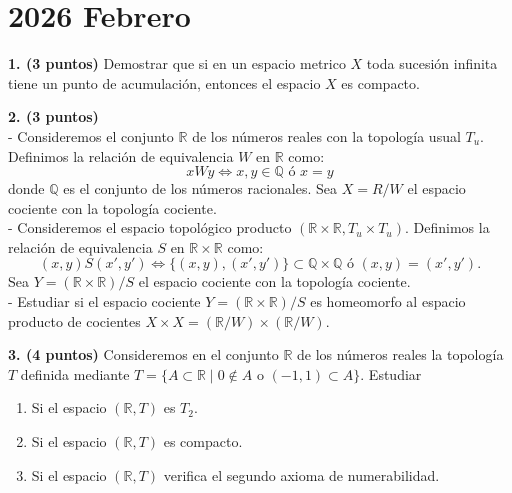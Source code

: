 \clearpage
\chapter*{2026 Febrero}

\begin{enunciado}
    \hypertarget{2026 B 1}{}
    \textbf{1. (3 puntos)} Demostrar que si en un espacio metrico \(X\) toda sucesión infinita tiene un punto de acumulación, entonces el espacio \(X\) es compacto.
\end{enunciado}

\begin{enunciado}
    \hypertarget{2026 B 2}{}
    \textbf{2. (3 puntos)}\\
    - Consideremos el conjunto \(\mathbb{R}\) de los números reales con la topología usual \(T_u\). Definimos la relación de equivalencia \(W\) en \(\mathbb{R}\) como:
    \[
        xWy \Leftrightarrow x,y \in \mathbb{Q} \text{ ó } x = y
    \]
    donde \(\mathbb{Q}\) es el conjunto de los números racionales. Sea \(X = R/W\) el espacio cociente con la topología cociente.\\
    - Consideremos el espacio topológico producto \((\mathbb{R} \times \mathbb{R}, T_u \times T_u)\). Definimos la relación de equivalencia \(S\) en \(\mathbb{R} \times \mathbb{R}\) como:
    \[
        (x,y)S(x',y') \Leftrightarrow \{(x,y),(x',y')\} \subset \mathbb{Q} \times \mathbb{Q} \text{ ó } (x,y) = (x',y').
    \]
    Sea \(Y = (\mathbb{R} \times \mathbb{R})/S\) el espacio cociente con la topología cociente.\\
    - Estudiar si el espacio cociente \(Y = (\mathbb{R} \times \mathbb{R})/S\) es homeomorfo al espacio producto de cocientes \(X \times X = (\mathbb{R}/W) \times (\mathbb{R}/W)\).
\end{enunciado}

\begin{enunciado}
    \hypertarget{2026 B 3}{}
    \textbf{3. (4 puntos)} Consideremos en el conjunto \(\mathbb{R}\) de los números reales la topología \(T\) definida mediante \(T = \{A \subset \mathbb{R} \mid 0 \notin A \text{ o } (-1, 1) \subset A\}\). Estudiar
    \begin{enumerate}[label=\alph*)]
        \item Si el espacio \((\mathbb{R}, T)\) es \(T_2\).
        \item Si el espacio \((\mathbb{R}, T)\) es compacto.
        \item Si el espacio \((\mathbb{R}, T)\) verifica el segundo axioma de numerabilidad.
    \end{enumerate}
\end{enunciado}

